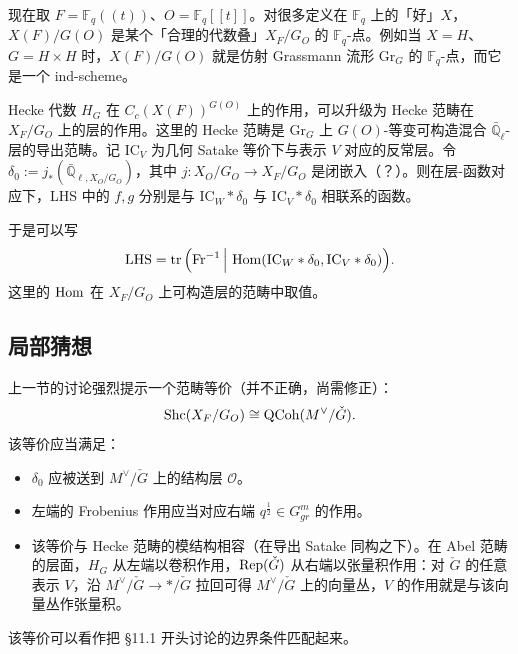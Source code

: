 现在取 $F=\mathbb F_q((t))$、$O=\mathbb F_q[[t]]$。对很多定义在 $\mathbb F_q$ 上的「好」$X$，$X(F)/G(O)$ 是某个「合理的代数叠」$X_F/G_O$ 的 $\mathbb F_q$-点。例如当 $X=H$、$G=H\times H$ 时，$X(F)/G(O)$ 就是仿射 Grassmann 流形 $\mathrm{Gr}_G$ 的 $\mathbb F_q$-点，而它是一个 ind-scheme。

Hecke 代数 $H_G$ 在 $C_c(X(F))^{G(O)}$ 上的作用，可以升级为 Hecke 范畴在 $X_F/G_O$ 上的层的作用。这里的 Hecke 范畴是 $\mathrm{Gr}_G$ 上 $G(O)$-等变可构造混合 $\bar{\mathbb Q}_\ell$-层的导出范畴。记 $\mathrm{IC}_V$ 为几何 Satake 等价下与表示 $V$ 对应的反常层。令 $\delta_0:=j_*(\bar{\mathbb Q}_{\ell,X_O/G_O})$，其中 $j:X_O/G_O\to X_F/G_O$ 是闭嵌入（？）。则在层-函数对应下，LHS 中的 $f,g$ 分别是与 $\mathrm{IC}_W*\delta_0$ 与 $\mathrm{IC}_V*\delta_0$ 相联系的函数。

于是可以写
\begin{equation}
  \mathrm{LHS}=\operatorname{tr}\Big(\mathrm{Fr}^{-1}\,\Big|\,\operatorname{Hom}(\mathrm{IC}_W*\delta_0,\mathrm{IC}_V*\delta_0)\Big).
  \label{eq:11-11}
\end{equation}
这里的 $\operatorname{Hom}$ 在 $X_F/G_O$ 上可构造层的范畴中取值。

\subsection{局部猜想}

上一节的讨论强烈提示一个范畴等价（并不正确，尚需修正）：
\begin{equation}
  \mathrm{Shc}(X_F/G_O)\cong\operatorname{QCoh}(M^\vee/\check G).
  \label{eq:11-12}
\end{equation}
该等价应当满足：

\begin{itemize}[leftmargin=1.6em]
  \item $\delta_0$ 应被送到 $M^\vee/\check G$ 上的结构层 $\mathcal O$。
  \item 左端的 Frobenius 作用应当对应右端 $q^{\frac12}\in G_{gr}^m$ 的作用。
  \item 该等价与 Hecke 范畴的模结构相容（在导出 Satake 同构之下）。在 Abel 范畴的层面，$H_G$ 从左端以卷积作用，$\operatorname{Rep}(\check G)$ 从右端以张量积作用：对 $\check G$ 的任意表示 $V$，沿 $M^\vee/\check G\to*/\check G$ 拉回可得 $M^\vee/\check G$ 上的向量丛，$V$ 的作用就是与该向量丛作张量积。
\end{itemize}

该等价可以看作把 §11.1 开头讨论的边界条件匹配起来。


